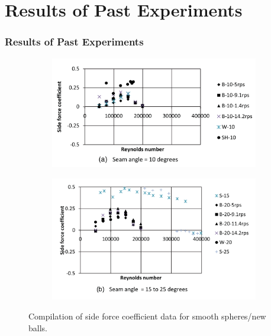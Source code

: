 \documentclass{beamer}
\begin{document}
\section{Results of Past Experiments}
\begin{frame}
\frametitle{Results of Past Experiments}

\begin{figure}[h!]
  \centering
  \begin{subfigure}[b]{0.5\linewidth}
    \includegraphics[width=\linewidth]{./figs/my_4.png}
  \end{subfigure}
  \begin{subfigure}[b]{0.5\linewidth}
    \includegraphics[width=\linewidth]{./figs/my_5.png}
  \end{subfigure}
  \caption{Compilation of side force coefficient data for
smooth spheres/new balls.}
  \label{fig:side1}
\end{figure}
\end{frame}
\end{document}
